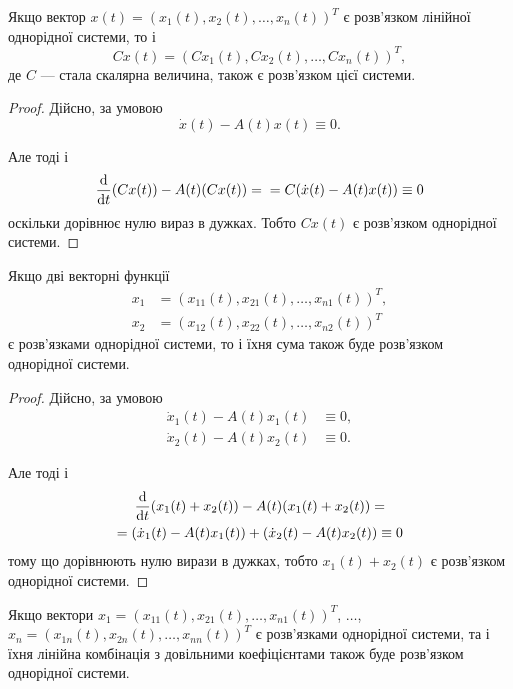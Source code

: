 \setcounter{property}{0}
\begin{property}
	Якщо вектор $x(t) = (x_1(t), x_2(t), \ldots, x_n(t))^T$ є розв'язком лінійної однорідної системи, то і \[ C x(t) = (C x_1(t), C x_2(t), \ldots, C x_n(t))^T,\] де $C$ --- стала скалярна величина, також є розв'язком цієї системи.
\end{property}

\begin{proof}
	Дійсно, за умовою 
	\begin{equation*}
		\dot x(t) - A(t) x(t) \equiv 0.
	\end{equation*}

	Але тоді і
	\begin{equation*}
		\frac{\mathop{}\!\mathrm{d}}{\mathop{}\!\mathrm{d} t} (C x(t)) - A(t) (C x(t)) = \\ = C (\dot x(t) - A(t) x(t)) \equiv 0
	\end{equation*}
	оскільки дорівнює нулю вираз в дужках. Тобто $C x(t)$ є розв'язком однорідної системи.
\end{proof}

\begin{property}
	Якщо дві векторні функції \begin{align*} x_1 &= (x_{11}(t), x_{21}(t), \ldots, x_{n1}(t))^T, \\ x_2 &= (x_{12}(t), x_{22}(t), \ldots, x_{n2}(t))^T \end{align*} є розв'язками однорідної системи, то і їхня сума також буде розв'язком однорідної системи.
\end{property}

\begin{proof}
	Дійсно, за умовою
	\begin{align*}
		\dot x_1(t) - A(t) x_1(t) &\equiv 0, \\
		\dot x_2(t) - A(t) x_2(t) &\equiv 0.
	\end{align*}

	Але тоді і
	\begin{multline*}
		\frac{\mathop{}\!\mathrm{d}}{\mathop{}\!\mathrm{d} t} (x_1(t) + x_2(t)) - A(t) (x_1(t) + x_2(t)) = \\ = (\dot x_1(t) - A(t) x_1(t)) + (\dot x_2(t) - A(t) x_2(t)) \equiv 0
	\end{multline*}
	тому що дорівнюють нулю вирази в дужках, тобто $x_1(t) + x_2(t)$ є роз\-в'яз\-ком однорідної системи.
\end{proof}

\begin{property}
	Якщо вектори $x_1 = (x_{11}(t), x_{21}(t), \ldots, x_{n1}(t))^T$, $\ldots$, $x_n = (x_{1n}(t), x_{2n}(t), \ldots, x_{nn}(t))^T$ є розв'язками однорідної системи, та і їхня лінійна комбінація з довільними коефіцієнтами також буде розв'язком однорідної системи. 
\end{property}

